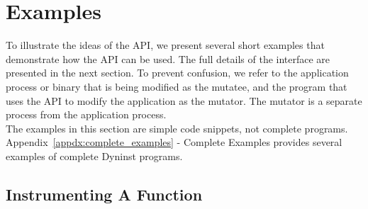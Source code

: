 \section{Examples}
\newcommand{\BPatch}[0]{\texttt{BPatch}\xspace}
\newcommand{\bpatch}[0]{\texttt{bpatch}\xspace}
\newcommand{\BPatchaddressSpace}[0]{\texttt{BPatch\_addressSpace}\xspace}
\newcommand{\BPatchprocess}[0]{\texttt{BPatch\_process}\xspace}
\newcommand{\BPatchbinaryEdit}[0]{\texttt{BPatch\_binaryEdit}\xspace}
\newcommand{\BPatchfunction}[0]{\texttt{BPatch\_function}\xspace}
\newcommand{\BPatchimage}[0]{\texttt{BPatch\_image}\xspace}
\newcommand{\BPatchmodule}[0]{\texttt{BPatch\_module}\xspace}
\newcommand{\BPatchpoint}[0]{\texttt{BPatch\_point}\xspace}
\newcommand{\BPatchedge}[0]{\texttt{BPatch\_edge}\xspace}
\newcommand{\BPatchflowGraph}[0]{\texttt{BPatch\_flowGraph}\xspace}
\newcommand{\BPatchbasicBlock}[0]{\texttt{BPatch\_basicBlock}\xspace}
\newcommand{\BPatchsnippet}[0]{\texttt{BPatch\_snippet}\xspace}
\newcommand{\insertSnippet}[0]{\texttt{insertSnippet}\xspace}
\newcommand{\InstructionAPIReferenceManual}[0]{\underline{InstructionAPI Reference Manual}\xspace}
\newcommand{\code}[1]{\\\\\texttt{#1}\\}
\newcommand{\BPatchbytesAccessedExpr}[0]{\texttt{BPatch\_bytesAccessedExpr}\xspace}
\newcommand{\BPatcheffectiveAddressExpr }[0]{\texttt{BPatch\_effectiveAddressExpr }\xspace}

To illustrate the ideas of the API, we present several short examples that demonstrate how the API can be used.  The full details of the interface are presented in the next section.  To prevent confusion, we refer to the application process or binary that is being modified as the mutatee, and the program that uses the API to modify the application as the mutator.  The mutator is a separate process from the application process.\\

The examples in this section are simple code snippets, not complete programs.  Appendix~\ref{appdx:complete_examples} - Complete Examples provides several examples of complete Dyninst programs.

\subsection{Instrumenting A Function}

